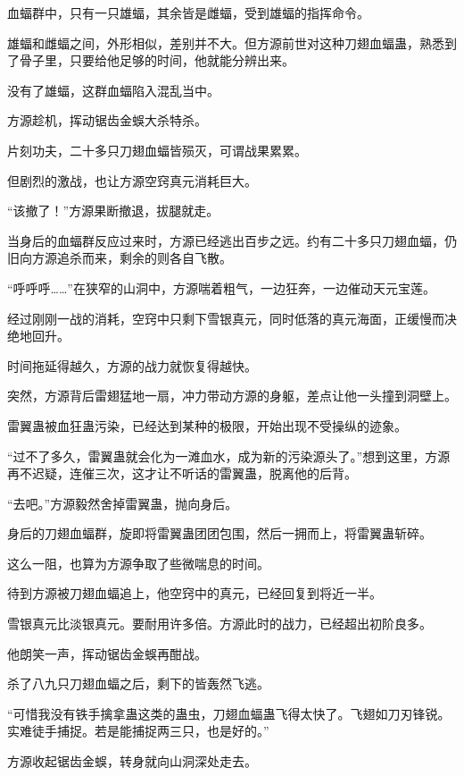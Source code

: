 
\begin{this_body}

血蝠群中，只有一只雄蝠，其余皆是雌蝠，受到雄蝠的指挥命令。

雄蝠和雌蝠之间，外形相似，差别并不大。但方源前世对这种刀翅血蝠蛊，熟悉到了骨子里，只要给他足够的时间，他就能分辨出来。

没有了雄蝠，这群血蝠陷入混乱当中。

方源趁机，挥动锯齿金蜈大杀特杀。

片刻功夫，二十多只刀翅血蝠皆殒灭，可谓战果累累。

但剧烈的激战，也让方源空窍真元消耗巨大。

“该撤了！”方源果断撤退，拔腿就走。

当身后的血蝠群反应过来时，方源已经逃出百步之远。约有二十多只刀翅血蝠，仍旧向方源追杀而来，剩余的则各自飞散。

“呼呼呼……”在狭窄的山洞中，方源喘着粗气，一边狂奔，一边催动天元宝莲。

经过刚刚一战的消耗，空窍中只剩下雪银真元，同时低落的真元海面，正缓慢而决绝地回升。

时间拖延得越久，方源的战力就恢复得越快。

突然，方源背后雷翅猛地一扇，冲力带动方源的身躯，差点让他一头撞到洞壁上。

雷翼蛊被血狂蛊污染，已经达到某种的极限，开始出现不受操纵的迹象。

“过不了多久，雷翼蛊就会化为一滩血水，成为新的污染源头了。”想到这里，方源再不迟疑，连催三次，这才让不听话的雷翼蛊，脱离他的后背。

“去吧。”方源毅然舍掉雷翼蛊，抛向身后。

身后的刀翅血蝠群，旋即将雷翼蛊团团包围，然后一拥而上，将雷翼蛊斩碎。

这么一阻，也算为方源争取了些微喘息的时间。

待到方源被刀翅血蝠追上，他空窍中的真元，已经回复到将近一半。

雪银真元比淡银真元。要耐用许多倍。方源此时的战力，已经超出初阶良多。

他朗笑一声，挥动锯齿金蜈再酣战。

杀了八九只刀翅血蝠之后，剩下的皆轰然飞逃。

“可惜我没有铁手擒拿蛊这类的蛊虫，刀翅血蝠蛊飞得太快了。飞翅如刀刃锋锐。实难徒手捕捉。若是能捕捉两三只，也是好的。”

方源收起锯齿金蜈，转身就向山洞深处走去。


\end{this_body}
